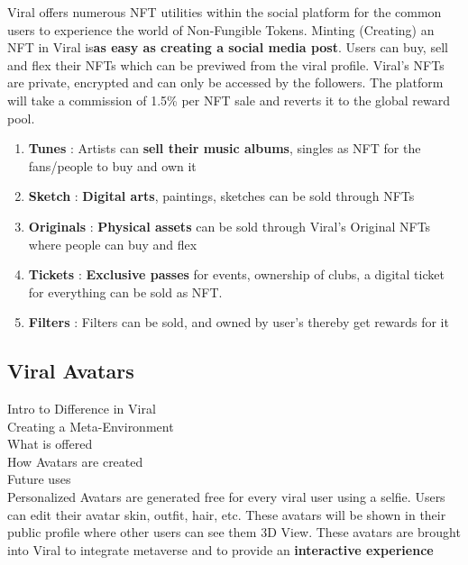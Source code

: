 \documentclass[conference]{IEEEtran}
\begin{document}
\begin{enumerate}[wide, labelwidth=!, labelindent=0pt]
Viral offers numerous NFT utilities within the social platform for the common users to experience the world of Non-Fungible Tokens. Minting (Creating) an NFT in Viral is\textbf{as easy as creating a social media post}. Users can buy, sell and flex their NFTs which can be previwed from the viral profile. Viral's NFTs are private, encrypted and can only be accessed by the followers. The platform will take a commission of 1.5\% per NFT sale and reverts it to the global reward pool.
\begin{enumerate}[wide, labelwidth=!, labelindent=0pt]
\item \textbf{Tunes} : Artists can \textbf{sell their music albums}, singles as NFT for the fans/people to buy and own it

\item \textbf{Sketch} : \textbf{Digital arts}, paintings, sketches can be sold through NFTs

\item \textbf{Originals} : \textbf{Physical assets} can be sold through Viral's Original NFTs where people can buy and flex

\item \textbf{Tickets} : \textbf{Exclusive passes} for events, ownership of clubs, a digital ticket for everything can be sold as NFT. 

\item \textbf{Filters} : Filters can be sold, and owned by user's thereby get rewards for it
\end{enumerate}
\end{enumerate}

\subsection{\textbf{Viral Avatars}}

Intro to Difference in Viral\\

Creating a Meta-Environment\\

What is offered\\

How Avatars are created\\

Future uses\\

Personalized Avatars are generated free for every viral user using a selfie. Users can edit their avatar skin, outfit, hair, etc. These avatars will be shown in their public profile where other users can see them 3D View. These avatars are brought into Viral to integrate metaverse and to provide an \textbf{interactive experience}\\
\end{document}
